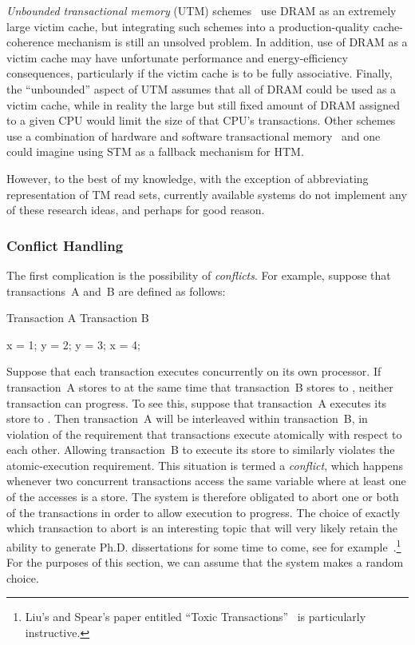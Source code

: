 \emph{Unbounded transactional memory} (UTM)
schemes~\cite{CScottAnanian2006,KevinEMoore2006}
use DRAM as an extremely large victim cache, but integrating such schemes
into a production-quality cache-coherence mechanism is still an unsolved
problem.
In addition, use of DRAM as a victim cache may have unfortunate
performance and energy-efficiency consequences, particularly
if the victim cache is to be fully associative.
Finally, the ``unbounded'' aspect of UTM assumes that all of DRAM
could be used as a victim cache, while in reality
the large but still fixed amount of DRAM assigned to a given CPU
would limit the size of that CPU's transactions.
Other schemes use a combination of hardware and software transactional
memory~\cite{SanjeevKumar2006} and one could imagine using STM as a
fallback mechanism for HTM.

However, to the best of my knowledge, with the exception of abbreviating
representation of TM read sets, currently available systems do not
implement any of these research ideas, and perhaps for good reason.

\subsubsection{Conflict Handling}
\label{sec:future:Conflict Handling}

The first complication is the possibility of \emph{conflicts}.
For example, suppose that transactions~A and~B are defined as follows:

\begin{VerbatimU}
Transaction A       Transaction B

x = 1;              y = 2;
y = 3;              x = 4;
\end{VerbatimU}

Suppose that each transaction executes concurrently on its own processor.
If transaction~A stores to  at the same time that transaction~B
stores to , neither transaction can progress.
To see this, suppose that transaction~A executes its store to .
Then transaction~A will be interleaved within transaction~B, in violation
of the requirement that transactions execute atomically with respect to
each other.
Allowing transaction~B to execute its store to  similarly violates
the atomic-execution requirement.
This situation is termed a \emph{conflict}, which happens whenever two
concurrent transactions access the same variable where at least one of
the accesses is a store.
The system is therefore obligated to abort one or both of the transactions
in order to allow execution to progress.
The choice of exactly which transaction to abort is an interesting topic
that will very likely retain the ability to generate Ph.D. dissertations for
some time to come, see for
example~\cite{EgeAkpinar2011HTM2TLE}.\footnote{
	Liu's and Spear's paper entitled ``Toxic
	Transactions''~\cite{YujieLiu2011ToxicTransactions} is
	particularly instructive.}
For the purposes of this section, we can assume that the system makes
a random choice.

